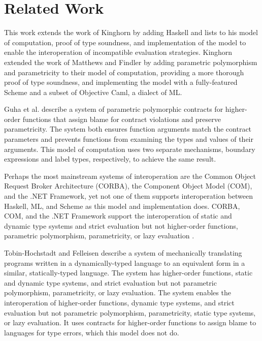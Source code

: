 \chapter{Related Work}

This work extends the work of Kinghorn \cite{kinghorn07} by adding Haskell and lists to his model of computation, proof of type soundness, and implementation of the model to enable the interoperation of incompatible evaluation strategies.  Kinghorn extended the work of Matthews and Findler \cite{matthews07} by adding parametric polymorphism and parametricity to their model of computation, providing a more thorough proof of type soundness, and implementing the model with a fully-featured Scheme and a subset of Objective Caml, a dialect of ML.

Guha et al. \cite{guha07} describe a system of parametric polymorphic contracts for higher-order functions that assign blame for contract violations and preserve parametricity.  The system both ensures function arguments match the contract parameters and prevents functions from examining the types and values of their arguments. This model of computation uses two separate mechanisms, boundary expressions and label types, respectively, to achieve the same result.

Perhaps the most mainstream systems of interoperation are the Common Object Request Broker Architecture (CORBA), the Component Object Model (COM), and the .NET Framework, yet not one of them supports interoperation between Haskell, ML, and Scheme as this model and implementation does.  CORBA, COM, and the .NET Framework support the interoperation of static and dynamic type systems and strict evaluation but not higher-order functions, parametric polymorphism, parametricity, or lazy evaluation \cite{omg04} \cite{microsoft07} \cite{ecma06}.

Tobin-Hochstadt and Felleisen \cite{tobin-hochstadt06} describe a system of mechanically translating programs written in a dynamically-typed language to an equivalent form in a similar, statically-typed language.  The system has higher-order functions, static and dynamic type systems, and strict evaluation but not parametric polymorphism, parametricity, or lazy evaluation.  The system enables the interoperation of higher-order functions, dynamic type systems, and strict evaluation but not parametric polymorphism, parametricity, static type systems, or lazy evaluation.  It uses contracts for higher-order functions to assign blame to languages for type errors, which this model does not do.

